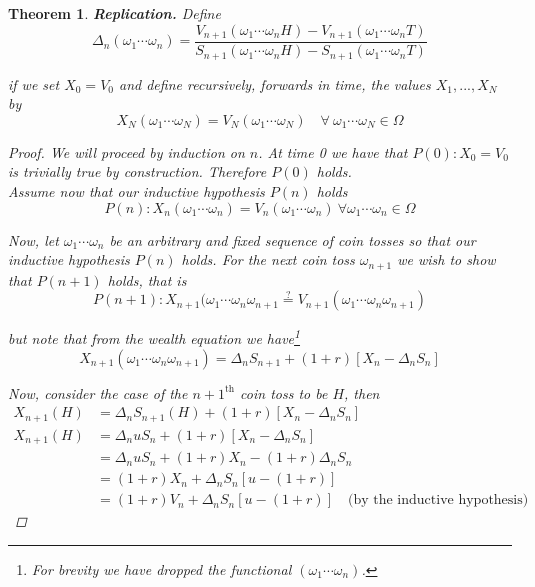 \documentclass[12pt]{article}
\newtheorem{theorem}{Theorem}
\newlength\tindent
\renewcommand{\indent}{\hspace*{\tindent}}
\begin{document}
\begin{theorem} {\bf Replication.} Define 
\begin{equation*}
	\Delta_n(\omega_1\cdots\omega_n) = \frac{V_{n + 1}(\omega_1\cdots\omega_n H) - V_{n + 1}(\omega_1\cdots\omega_n T)}{S_{n + 1}(\omega_1\cdots\omega_n H) - S_{n + 1}(\omega_1\cdots\omega_n T)}
\end{equation*}

if we set $X_0 = V_0$ and define recursively, forwards in time, the values $X_1,..., X_N$ by
\begin{equation*}
	X_N(\omega_1\cdots\omega_N) = V_N(\omega_1\cdots\omega_N) \quad \forall~\omega_1\cdots\omega_N \in \Omega
\end{equation*}

\begin{proof} We will proceed by induction on $n$. At time 0 we have that $P(0): X_0 = V_0$ is trivially true by construction. Therefore $P(0)$ holds. \\

Assume now that our inductive hypothesis $P(n)$ holds
\begin{equation*}
	P(n): X_n(\omega_1\cdots\omega_n) = V_n(\omega_1\cdots\omega_n) ~ \forall \omega_1\cdots\omega_n \in \Omega
\end{equation*}

\indent Now, let $\omega_1\cdots\omega_n$ be an arbitrary and fixed sequence of coin tosses so that our inductive hypothesis $P(n)$ holds. For the next coin toss $\omega_{n + 1}$ we wish to show that $P(n + 1)$ holds, that is
\begin{equation*}
	P(n + 1): X_{n + 1}(\omega_1\cdots\omega_n\omega_{n + 1} \stackrel{?}{=} V_{n + 1}(\omega_1\cdots\omega_n\omega_{n + 1})
\end{equation*}

but note that from the wealth equation we have\footnote{For brevity we have dropped the functional $(\omega_1\cdots\omega_n)$.}
\begin{equation*}
	X_{n + 1}(\omega_1\cdots\omega_n\omega_{n + 1}) = \Delta_n S_{n + 1} + (1 + r)[X_n - \Delta_nS_n] 
\end{equation*}

Now, consider the case of the $n + 1^{\text{th}}$ coin toss to be $H$, then
\begin{align*} 
	X_{n + 1}(H) &= \Delta_n S_{n + 1}(H) + (1 + r)[X_n - \Delta_nS_n] \\
	X_{n + 1}(H) &= \Delta_n u S_n + (1 + r)[X_n - \Delta_n S_n] \\
	&= \Delta_n u S_n + (1 + r)X_n - (1 + r)\Delta_n S_n \\
	&= (1 + r)X_n + \Delta_n S_n [u - (1 + r)] \\
	&= (1 + r)V_n + \Delta_n S_n [u - (1 + r)] \quad \text{(by the inductive hypothesis)}
\end{align*}


\end{proof}
\end{theorem}
\end{document}
